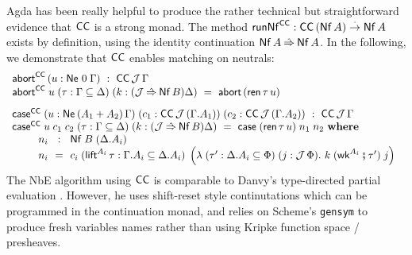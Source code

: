 \documentclass[a4paper,USenglish,cleveref, autoref]{lipics-v2019}
\begin{document}
Agda has been really helpful to produce the rather technical but
straightforward evidence that $\CC$ is a strong monad.
The method $\trunNf[\CC] : \CC\,(\tNf\,A) \todot \tNf\,A$
exists by definition, using the identity continuation $\tNf\,A \hatto \tNf\,A$.
In the following, we demonstrate that $\CC$
enables matching on neutrals:
\[
\begin{array}{l}
  \tabort^{\CC} \, (u : \Ne \tyzero \Gamma) ~:~  \CC\,\J\,\Gamma \\
  \tabort^{\CC}
    \; u
    \; (\tau : \Gamma \sublist \Delta)
    \; (k : (\J \hatto \tNf\,B)\Delta)
     ~=~
    \tabort\,(\tren\,\tau\,u)
\\[2ex]
  \tcase^{\CC}
     \; (u : \NeP {A_1 + A_2} \Gamma)
     \; (c_1 : \CC\,\J\,(\cext \Gamma {A_1}))
     \; (c_2 : \CC\,\J\,(\cext \Gamma {A_2}))
    ~:~ \CC\,\J\,\Gamma \\
  \tcase^{\CC}
    \; u
    \; c_1
    \; c_2
    \; (\tau : \Gamma \sublist \Delta)
    \; (k : (\J \hatto \tNf\,B)\Delta)
     ~=~
    \tcase\;(\tren\,\tau\,u)\;n_1\;n_2
    \bwhere \\
\qquad
  \begin{array}{l@{~~}c@{~~}l}
     n_i & : & \Nf B {(\cext \Delta {A_i})} \\
     n_i & = & c_i
      \; (\tlift^{A_i}\,\tau
            : \cext \Gamma {A_i} \sublist \cext \Delta {A_i})
      \; \left(\lambda
            \; (\tau' : \cext \Delta {A_i} \sublist \Phi)
            \; (j :  \J\,\Phi) .
            \ k
            \; (\twk^{A_i} \rcomp \tau')
            \; j
         \right)
  \end{array}
\end{array}
\]
The NbE algorithm using $\CC$ is comparable to Danvy's type-directed
partial evaluation \cite[Figure~8]{danvy:popl96}.  However, he uses
shift-reset style continutations which can be programmed in the
continuation monad, and relies on Scheme's \texttt{gensym} to produce
fresh variables names rather than using Kripke function space / presheaves.



\end{document}
